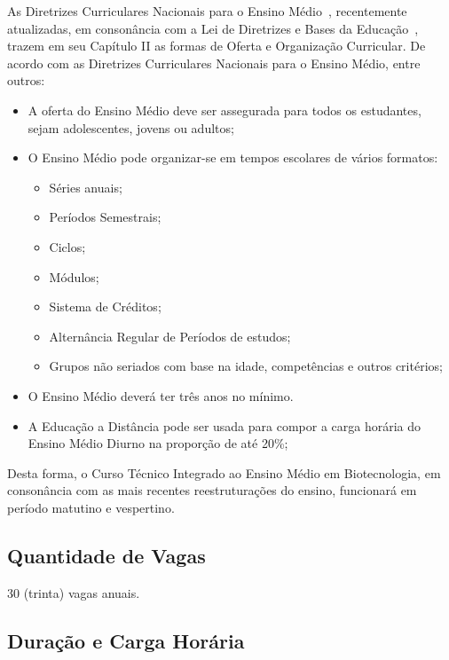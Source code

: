 \documentclass[11pt,fleqn]{book} %
\begin{document}
As Diretrizes Curriculares Nacionais para o Ensino Médio~\cite{Resolucao032018}, recentemente atualizadas, em consonância com a Lei de Diretrizes e Bases da Educação~\cite{Lei19394De1996}, trazem em seu Capítulo II as formas de Oferta e Organização Curricular. 
De acordo com as Diretrizes Curriculares Nacionais para o Ensino Médio, entre outros:

\begin{itemize}
	\item A oferta do Ensino Médio deve ser assegurada para todos os estudantes, sejam adolescentes,
	jovens ou adultos;
	\item O Ensino Médio pode organizar-se em tempos escolares de vários formatos:
	\begin{itemize}
		\item Séries anuais;
		\item Períodos Semestrais;
		\item Ciclos;
		\item Módulos;
		\item Sistema de Créditos;
		\item Alternância Regular de Períodos de estudos;
		\item Grupos não seriados com base na idade, competências e outros critérios;
	\end{itemize}
	\item O Ensino Médio deverá ter três anos no mínimo.
	\item A Educação a Distância pode ser usada para compor a carga horária do Ensino Médio Diurno na proporção de até 20\%;
\end{itemize}

Desta forma, o Curso Técnico Integrado ao Ensino Médio em Biotecnologia, em consonância com as mais recentes reestruturações do ensino, funcionará em período matutino e vespertino.

\subsection{Quantidade de Vagas}
\indent

30 (trinta) vagas anuais. 

\subsection{Duração e Carga Horária}
\indent
\end{document}
